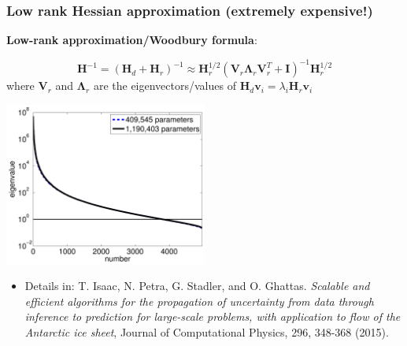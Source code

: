 \documentclass[10pt,final,xcolor=dvipsnames]{beamer}
\newcommand{\bs}[1]{\ensuremath{\boldsymbol{#1}}}
\newcommand{\Hmatrix}{\bs{H}}
\begin{document}
\begin{frame}
	\frametitle{Low rank Hessian approximation (extremely expensive!)}
	
	\textbf{Low-rank approximation/Woodbury formula}:
	
	\[
	\Hmatrix^{-1} =
	\left ( {\bs{H}_d} + \mathbf{H}_r \right)^{-1}
	\approx \mathbf{H}_r^{1/2} (\bs{V}_r \bs{\Lambda}_r \bs{V}^T_r + \bs{I})^{-1}
	\mathbf{H}_r^{1/2} 
	\]
	where $\bs{V}_r$ and $\bs{\Lambda}_r$ are the eigenvectors/values of
	$\bs{H}_d \bs{v}_i = \lambda_i \mathbf{H}_r \bs{v}_i $
	\begin{center}
		\includegraphics[width=0.5\textwidth]{spec_ppmisfit_hess_coarseandfine_new.pdf}
	\end{center}
	
	\begin{itemize}
		\item [] \scriptsize{Details in: T. Isaac, N. Petra, G. Stadler, and
			O. Ghattas. {\em Scalable and efficient algorithms for the
				propagation of uncertainty from data through inference to
				prediction for large-scale problems, with application to flow of
				the Antarctic ice sheet}, Journal of Computational Physics, 296,
			348-368 (2015).}
	\end{itemize}
\end{frame}
%	
%	
%	
\end{document}
